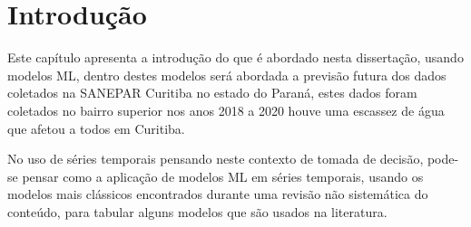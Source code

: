 

\section{Introdu{\c c}{\~a}o} \label{sec:int}

Este capítulo apresenta a introdução do que é abordado nesta dissertação, usando modelos ML, dentro destes modelos será abordada a previsão futura dos dados coletados na SANEPAR Curitiba no estado do Paraná, estes dados foram coletados no bairro superior nos anos 2018 a 2020 houve uma escassez de água que afetou a todos em Curitiba.

No uso de séries temporais pensando neste contexto de tomada de decisão, pode-se pensar como a aplicação de modelos ML em séries temporais, usando os modelos mais clássicos encontrados durante uma revisão não sistemática do conteúdo, para tabular alguns modelos que são usados na literatura.  




    
          
    
    
    
    
    
    
    
    